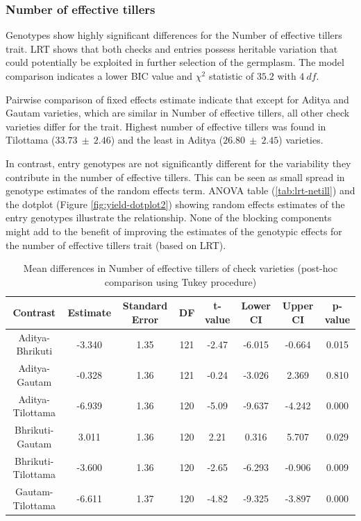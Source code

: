 \documentclass[12pt,oneside]{dukestatscithesis} %
\theoremstyle{definition}
\theoremstyle{definition}
\theoremstyle{definition}
\theoremstyle{remark}
\begin{document}
\subsubsection{Number of effective
tillers}\label{number-of-effective-tillers}

Genotypes show highly significant differences for the Number of
effective tillers trait. LRT shows that both checks and entries possess
heritable variation that could potentially be exploited in further
selection of the germplasm. The model comparison indicates a lower BIC
value and \(\chi^2\) statistic of \(35.2\) with \(4\ df\).

Pairwise comparison of fixed effects estimate indicate that except for
Aditya and Gautam varieties, which are similar in Number of effective
tillers, all other check varieties differ for the trait. Highest number
of effective tillers was found in Tilottama (\(33.73\ \pm\ 2.46\)) and
the least in Aditya (\(26.80\ \pm\ 2.45\)) varieties.

In contrast, entry genotypes are not significantly different for the
variability they contribute in the number of effective tillers. This can
be seen as small spread in genotype estimates of the random effects
term. ANOVA table (\ref{tab:lrt-netill}) and the dotplot (Figure
\ref{fig:yield-dotplot2}) showing random effects estimates of the entry
genotypes illustrate the relationship. None of the blocking components
might add to the benefit of improving the estimates of the genotypic
effects for the number of effective tillers trait (based on LRT).
\begin{table}[H]

\caption{\label{tab:yield-meanconf-tab2}Mean differences in Number of effective tillers of check varieties (post-hoc comparison using Tukey procedure)}
\centering
\begin{tabular}[t]{cccccccc}
\toprule
Contrast & Estimate & Standard Error & DF & t-value & Lower CI & Upper CI & p-value\\
\midrule
Aditya-Bhrikuti & -3.340 & 1.35 & 121 & -2.47 & -6.015 & -0.664 & 0.015\\
Aditya-Gautam & -0.328 & 1.36 & 121 & -0.24 & -3.026 & 2.369 & 0.810\\
Aditya-Tilottama & -6.939 & 1.36 & 120 & -5.09 & -9.637 & -4.242 & 0.000\\
Bhrikuti-Gautam & 3.011 & 1.36 & 120 & 2.21 & 0.316 & 5.707 & 0.029\\
Bhrikuti-Tilottama & -3.600 & 1.36 & 120 & -2.65 & -6.293 & -0.906 & 0.009\\
Gautam-Tilottama & -6.611 & 1.37 & 120 & -4.82 & -9.325 & -3.897 & 0.000\\
\bottomrule
\end{tabular}
\end{table}
\end{document}
